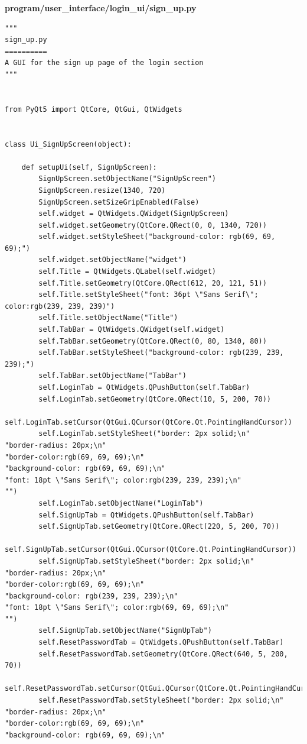 \documentclass[12pt]{article}
\begin{document}
\textbf{program/user\_interface/login\_ui/sign\_up.py}
\begin{lstlisting}
"""
sign_up.py
==========
A GUI for the sign up page of the login section
"""


from PyQt5 import QtCore, QtGui, QtWidgets


class Ui_SignUpScreen(object):

    def setupUi(self, SignUpScreen):
        SignUpScreen.setObjectName("SignUpScreen")
        SignUpScreen.resize(1340, 720)
        SignUpScreen.setSizeGripEnabled(False)
        self.widget = QtWidgets.QWidget(SignUpScreen)
        self.widget.setGeometry(QtCore.QRect(0, 0, 1340, 720))
        self.widget.setStyleSheet("background-color: rgb(69, 69, 69);")
        self.widget.setObjectName("widget")
        self.Title = QtWidgets.QLabel(self.widget)
        self.Title.setGeometry(QtCore.QRect(612, 20, 121, 51))
        self.Title.setStyleSheet("font: 36pt \"Sans Serif\"; color:rgb(239, 239, 239)")
        self.Title.setObjectName("Title")
        self.TabBar = QtWidgets.QWidget(self.widget)
        self.TabBar.setGeometry(QtCore.QRect(0, 80, 1340, 80))
        self.TabBar.setStyleSheet("background-color: rgb(239, 239, 239);")
        self.TabBar.setObjectName("TabBar")
        self.LoginTab = QtWidgets.QPushButton(self.TabBar)
        self.LoginTab.setGeometry(QtCore.QRect(10, 5, 200, 70))
        self.LoginTab.setCursor(QtGui.QCursor(QtCore.Qt.PointingHandCursor))
        self.LoginTab.setStyleSheet("border: 2px solid;\n"
"border-radius: 20px;\n"
"border-color:rgb(69, 69, 69);\n"
"background-color: rgb(69, 69, 69);\n"
"font: 18pt \"Sans Serif\"; color:rgb(239, 239, 239);\n"
"")
        self.LoginTab.setObjectName("LoginTab")
        self.SignUpTab = QtWidgets.QPushButton(self.TabBar)
        self.SignUpTab.setGeometry(QtCore.QRect(220, 5, 200, 70))
        self.SignUpTab.setCursor(QtGui.QCursor(QtCore.Qt.PointingHandCursor))
        self.SignUpTab.setStyleSheet("border: 2px solid;\n"
"border-radius: 20px;\n"
"border-color:rgb(69, 69, 69);\n"
"background-color: rgb(239, 239, 239);\n"
"font: 18pt \"Sans Serif\"; color:rgb(69, 69, 69);\n"
"")
        self.SignUpTab.setObjectName("SignUpTab")
        self.ResetPasswordTab = QtWidgets.QPushButton(self.TabBar)
        self.ResetPasswordTab.setGeometry(QtCore.QRect(640, 5, 200, 70))
        self.ResetPasswordTab.setCursor(QtGui.QCursor(QtCore.Qt.PointingHandCursor))
        self.ResetPasswordTab.setStyleSheet("border: 2px solid;\n"
"border-radius: 20px;\n"
"border-color:rgb(69, 69, 69);\n"
"background-color: rgb(69, 69, 69);\n"

\end{lstlisting}
\end{document}
